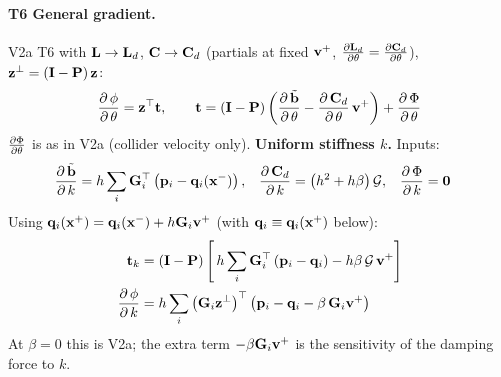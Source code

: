 \paragraph{T6 General gradient.}\mbox{}
\newline V2a T6 with $\mathbf{L} \to \mathbf{L}_d$, $\mathbf{C} \to \mathbf{C}_d$ (partials at fixed $\mathbf{v}^+$, $\frac{\partial \mathbf{L}_d}{\partial \theta} = \frac{\partial \mathbf{C}_d}{\partial \theta}$), $\mathbf{z}^\perp = \left(\mathbf{I} - \mathbf{P}\right)\mathbf{z}$:
\begin{equation*}
    \dfrac{\partial\, \phi}{\partial\, \theta} = \mathbf{z}^\top\mathbf{t},
    \qquad
    \mathbf{t} = \left(\mathbf{I} - \mathbf{P}\right)\left(\dfrac{\partial\, \tilde{\mathbf{b}}}{\partial\, \theta} - \dfrac{\partial\, \mathbf{C}_d}{\partial\, \theta}\,\mathbf{v}^+\right) + \dfrac{\partial\, \Phi}{\partial\, \theta}
\end{equation*}
\noindent $\frac{\partial \Phi}{\partial \theta}$ is as in V2a (collider velocity only).
\newline \textbf{Uniform stiffness $k$.} Inputs:
\begin{align*}
    \dfrac{\partial\, \tilde{\mathbf{b}}}{\partial\, k} &= h\sum_i\mathbf{G}_i^\top\left(\mathbf{p}_i - \mathbf{q}_i(\mathbf{x}^-)\right),
    &
    \dfrac{\partial\, \mathbf{C}_d}{\partial\, k} &= \left(h^2 + h\beta\right)\mathcal{G},
    &
    \dfrac{\partial\, \Phi}{\partial\, k} &= \mathbf{0}
\end{align*}
Using $\mathbf{q}_i(\mathbf{x}^+) = \mathbf{q}_i(\mathbf{x}^-) + h\mathbf{G}_i\mathbf{v}^+$ (with $\mathbf{q}_i \equiv \mathbf{q}_i(\mathbf{x}^+)$ below):
\begin{align*}
    \mathbf{t}_k &= \left(\mathbf{I} - \mathbf{P}\right)\left[\,h\sum_i\mathbf{G}_i^\top\left(\mathbf{p}_i - \mathbf{q}_i\right) - h\beta\,\mathcal{G}\,\mathbf{v}^+\right] \\
    \dfrac{\partial\, \phi}{\partial\, k} &= h\sum_i\left(\mathbf{G}_i\mathbf{z}^\perp\right)^\top\left(\mathbf{p}_i - \mathbf{q}_i - \beta\,\mathbf{G}_i\mathbf{v}^+\right)
\end{align*}
\noindent At $\beta = 0$ this is V2a; the extra term $-\beta\mathbf{G}_i\mathbf{v}^+$ is the sensitivity of the damping force to $k$.

